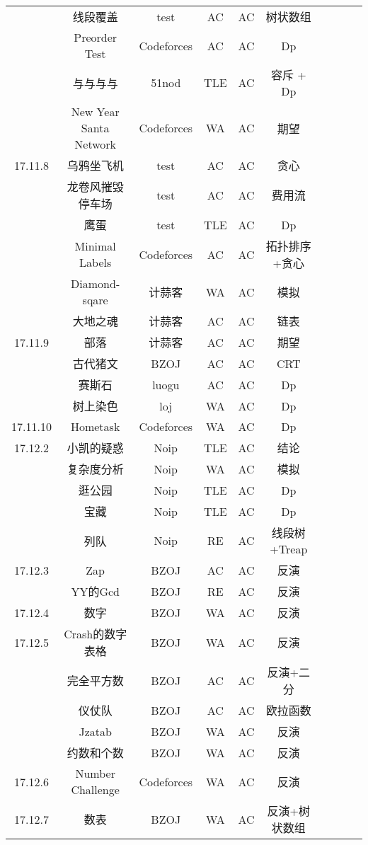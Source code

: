 \documentclass[landscape]{article}
\begin{document}
\begin{longtable}{cccccccccc}
  & 线段覆盖 & test & AC & AC & 树状数组\\
  & Preorder Test & Codeforces &  AC & AC & Dp\\
  & 与与与与 & 51nod & TLE & AC & 容斥 + Dp\\
  & New Year Santa Network & Codeforces & WA & AC & 期望\\
  \hline
  17.11.8 & 乌鸦坐飞机 & test & AC & AC & 贪心\\
  & 龙卷风摧毁停车场 & test & AC & AC & 费用流\\
  & 鹰蛋 & test & TLE & AC & Dp\\
  & Minimal Labels & Codeforces & AC & AC & 拓扑排序+贪心\\
  & Diamond-sqare & 计蒜客 & WA & AC & 模拟\\
  & 大地之魂 & 计蒜客 & AC & AC & 链表\\
  \hline
  17.11.9 & 部落 & 计蒜客 & AC & AC & 期望\\
  & 古代猪文 & BZOJ & AC & AC & CRT\\
  & 赛斯石 & luogu & AC & AC & Dp\\
  & 树上染色 & loj & WA & AC & Dp\\
  \hline
  17.11.10 & Hometask & Codeforces & WA & AC & Dp\\
  \hline
  17.12.2 & 小凯的疑惑 & Noip & TLE & AC & 结论\\
  & 复杂度分析 & Noip & WA &AC & 模拟\\
  & 逛公园 & Noip & TLE & AC & Dp\\
  & 宝藏 & Noip & TLE & AC & Dp\\
  & 列队 & Noip & RE & AC & 线段树+Treap\\
  \hline
  17.12.3 & Zap & BZOJ & AC & AC & 反演\\
  & YY的Gcd & BZOJ & RE & AC & 反演\\
  \hline
  17.12.4 & 数字 & BZOJ & WA & AC & 反演\\
  \hline
  17.12.5 & Crash的数字表格 & BZOJ & WA & AC & 反演\\
  & 完全平方数 & BZOJ & AC & AC & 反演+二分\\
  & 仪仗队 & BZOJ & AC & AC & 欧拉函数\\
  & Jzatab & BZOJ & WA & AC & 反演\\
  & 约数和个数 & BZOJ & WA & AC & 反演\\
  \hline
  17.12.6 & Number Challenge & Codeforces & WA & AC & 反演\\
  \hline
  17.12.7 & 数表 & BZOJ & WA & AC & 反演+树状数组\\

\end{longtable}
\end{document}
